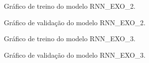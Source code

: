 \documentclass[	12pt, Times, openright, twoside, a4paper, english, brazil]{abntex2}
\begin{document}
    	    \begin{figure}[!ht]
              \caption{Gráfico de treino do modelo RNN\_EXO\_2. \label{fig:case2_rnn_exo2_train} }
            \end{figure}
            \begin{figure}[!ht]
              \caption{Gráfico de validação do modelo  RNN\_EXO\_2. \label{fig:case2_rnn_exo2_val} }
            \end{figure}
            
    	    \begin{figure}[!ht]
              \caption{Gráfico de treino do modelo RNN\_EXO\_3. \label{fig:case2_rnn_exo3_train} }
            \end{figure}
            \begin{figure}[!ht]
              \caption{Gráfico de validação do modelo  RNN\_EXO\_3. \label{fig:case2_rnn_exo3_val} }
            \end{figure}
            
\end{document}
